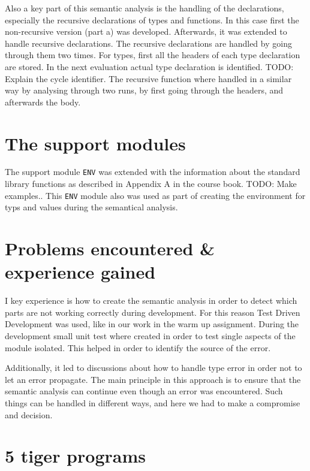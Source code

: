 \documentclass{article}
\begin{document}
Also a key part of this semantic analysis is the handling of the declarations, especially the recursive declarations of types and functions. In this case first the non-recursive version (part a) was developed. Afterwards, it was extended to handle recursive declarations. The recursive declarations are handled by going through them two times. For types, first all the headers of each type declaration are stored. In the next evaluation actual type declaration is identified. TODO: Explain the cycle identifier. The recursive function where handled in a similar way by analysing through two runs, by first going through the headers, and afterwards the body.  

\section{The support modules}

The support module \texttt{ENV} was extended with the information about the standard library functions as described in Appendix A in the course book. TODO: Make examples.. This \texttt{ENV} module also was used as part of creating the environment for typs and values during the semantical analysis. 


\section{Problems encountered \& experience gained}

I key experience is how to create the semantic analysis in order to detect which parts are not working correctly during development. For this reason Test Driven Development was used, like in our work in the warm up assignment. During the development small unit test where created in order to test single aspects of the module isolated. This helped in order to identify the source of the error.

Additionally, it led to discussions about how to handle type error in order not to let an error propagate. The main principle in this approach is to ensure that the semantic analysis can continue even though an error was encountered. Such things can be handled in different ways, and here we had to make a compromise and decision.

\section{5 tiger programs}
\end{document}

